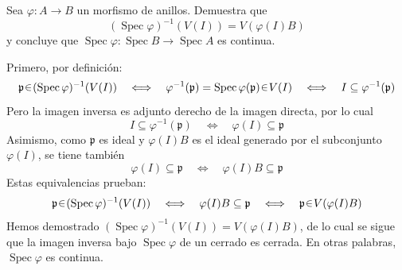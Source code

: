 \begin{ejer}
Sea $\varphi\colon A\to B$ un morfismo de anillos. Demuestra que
\[
(\operatorname{Spec}\varphi)^{-1}(V(I))=V(\varphi(I)B)
\]
y concluye que $\operatorname{Spec}\varphi\colon\operatorname{Spec}B\to\operatorname{Spec}A$ es continua.
\end{ejer}
\begin{sol}
Primero, por definición:
\[
\mathfrak{p}\en(\operatorname{Spec}\varphi)^{-1}(V(I))
\quad\Longleftrightarrow\quad
\varphi^{-1}(\mathfrak{p})=\operatorname{Spec}\varphi(\mathfrak{p})\en V(I)
\quad\Longleftrightarrow\quad
I\subseteq\varphi^{-1}(\mathfrak{p})
\]
Pero la imagen inversa es adjunto derecho de la imagen directa, por lo cual
\[
I\subseteq\varphi^{-1}(\mathfrak{p})
\quad\Longleftrightarrow\quad
\varphi(I)\subseteq\mathfrak{p}
\]
Asimismo, como $\mathfrak{p}$ es ideal y $\varphi(I)B$ es el ideal generado por el subconjunto $\varphi(I)$, se tiene también
\[
\varphi(I)\subseteq\mathfrak{p}
\quad\Longleftrightarrow\quad
\varphi(I)B\subseteq\mathfrak{p}
\]
Estas equivalencias prueban:
\[
\mathfrak{p}\en(\operatorname{Spec}\varphi)^{-1}(V(I))
\quad\Longleftrightarrow\quad
\varphi(I)B\subseteq\mathfrak{p}
\quad\Longleftrightarrow\quad
\mathfrak{p}\en V(\varphi(I)B)
\]
Hemos demostrado $(\operatorname{Spec}\varphi)^{-1}(V(I))=V(\varphi(I)B)$, de lo cual se sigue que la imagen inversa bajo $\operatorname{Spec}\varphi$ de un cerrado es cerrada. En otras palabras, $\operatorname{Spec}\varphi$ es continua.
\end{sol}
